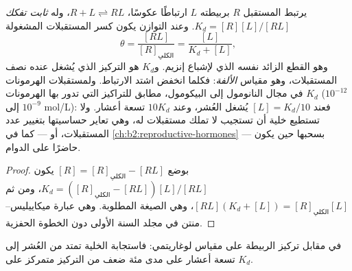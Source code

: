 \begin{theorem}\label{thm:b2:cell-signalling:occupancy}
يرتبط المستقبل $R$ بربيطته $L$ ارتباطًا عكوسًا، $R + L
\rightleftharpoons RL$، وله \emph{ثابت تفكك} $K_d =
[R][L]/[RL]$. وعند التوازن يكون كسر المستقبلات المشغولة
\[
\theta = \frac{[RL]}{[R]_{\text{الكلي}}} = \frac{[L]}{K_d + [L]},
\]
وهو القطع الزائد نفسه الذي لإشباع إنزيم. و$K_d$ هو
التركيز الذي يُشغل عنده نصف المستقبلات، وهو مقياس
\emph{الألفة}: فكلما انخفض اشتد الارتباط. ولمستقبلات الهرمونات
$K_d$ في مجال النانومول إلى البيكومول، مطابق
للتراكيز التي تدور بها الهرمونات ($10^{-12}$ إلى
$10^{-9}$ mol/L): فعند $[L] = K_d/10$ يُشغل العُشر، وعند
$10K_d$ تسعة أعشار. ولا تستطيع خلية أن تستجيب  لا
تملك مستقبلات له، وهي تعاير حساسيتها بتغيير
عدد المستقبلات، أو --- كما في \cref{ch:b2:reproductive-hormones}
--- بسحبها حين يكون  حاضرًا على الدوام.
\end{theorem}
\begin{proof}
بوضع $[R] = [R]_{\text{الكلي}} - [RL]$ يكون $K_d = ([R]_{\text{الكلي}} -
[RL])[L]/[RL]$، ومن ثم $[RL](K_d + [L]) = [R]_{\text{الكلي}}[L]$، وهي
الصيغة المطلوبة. وهي عبارة ميكاييليس--منتن في مجلد السنة
الأولى دون الخطوة الحفزية.
\end{proof}

\begin{omfigure}

{\small {} في مقابل تركيز الربيطة على مقياس
لوغاريتمي: فاستجابة الخلية تمتد من العُشر إلى تسعة
أعشار على مدى مئة ضعف من التركيز متمركز على $K_d$.}
\end{omfigure}

